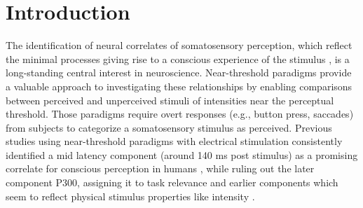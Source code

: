 \documentclass[11pt,a4paper,onecolumn]{article}
\begin{document}
\section*{Introduction}
\vspace{-7pt}

The identification of neural correlates of somatosensory perception, which reflect the minimal processes giving rise to a conscious experience of the stimulus \cite{koch_neural_2016}, is a long-standing central interest in neuroscience. Near-threshold paradigms provide a valuable approach to investigating these relationships by enabling comparisons between perceived and unperceived stimuli of intensities near the perceptual threshold. Those paradigms require overt responses (e.g., button press, saccades) from subjects to categorize a somatosensory stimulus as perceived. Previous studies using near-threshold paradigms with electrical stimulation consistently identified a mid latency component (around 140 ms post stimulus) as a promising correlate for conscious perception in humans \cite{schroderDistillingNeuralCorrelates2022, forschackAlphaBandBrainOscillations2017, forsterERPResponsesReveal2025}, while ruling out the later component P300, assigning it to task relevance \cite{schroderDissociatingPerceptualAwareness2021} and earlier components which seem to reflect physical stimulus properties like intensity \cite{schroderDissociatingPerceptualAwareness2021, forschackDissociableNeuralCorrelates2020}. 
\end{document}
